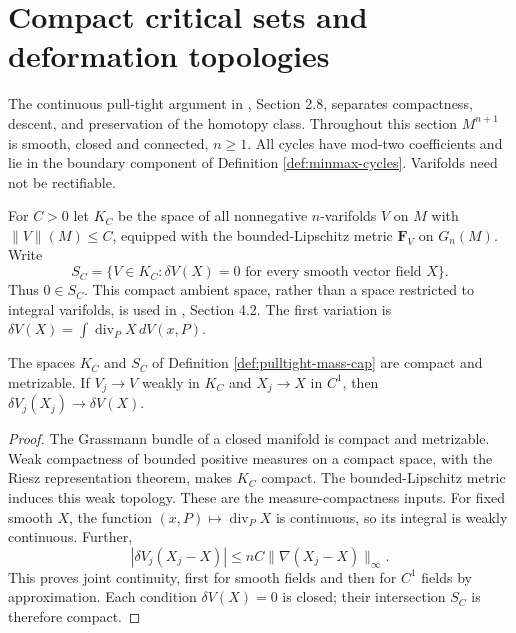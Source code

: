 \chapter{Compact critical sets and deformation topologies}\label{sec:critical-sets}
The continuous pull-tight argument in \cite{MNIndex}, Section 2.8, separates compactness, descent, and preservation of the homotopy class. Throughout this section $M^{n+1}$ is smooth, closed and connected, $n\geq1$. All cycles have mod-two coefficients and lie in the boundary component of Definition \ref{def:minmax-cycles}. Varifolds need not be rectifiable.

\begin{definition}\label{def:pulltight-mass-cap}
For $C>0$ let $K_C$ be the space of all nonnegative $n$-varifolds $V$ on $M$ with $\|V\|(M)\leq C$, equipped with the bounded-Lipschitz metric $\mathbf F_V$ on $G_n(M)$. Write
\[
 S_C=\{V\in K_C:\delta V(X)=0\text{ for every smooth vector field }X\}.
\]
Thus $0\in S_C$. This compact ambient space, rather than a space restricted to integral varifolds, is used in \cite{LiAP}, Section 4.2. The first variation is $\delta V(X)=\int\operatorname{div}_P X\,dV(x,P)$.
\end{definition}

\begin{lemma}\label{lem:pulltight-compact-cap}
The spaces $K_C$ and $S_C$ of Definition \ref{def:pulltight-mass-cap} are compact and metrizable. If $V_j\to V$ weakly in $K_C$ and $X_j\to X$ in $C^1$, then $\delta V_j(X_j)\to\delta V(X)$.
\end{lemma}
\begin{proof}
The Grassmann bundle of a closed manifold is compact and metrizable. Weak compactness of bounded positive measures on a compact space, with the Riesz representation theorem, makes $K_C$ compact. The bounded-Lipschitz metric induces this weak topology. These are the measure-compactness inputs. For fixed smooth $X$, the function $(x,P)\mapsto\operatorname{div}_P X$ is continuous, so its integral is weakly continuous. Further,
\[
 |\delta V_j(X_j-X)|\leq nC\|\nabla(X_j-X)\|_\infty.
\]
This proves joint continuity, first for smooth fields and then for $C^1$ fields by approximation. Each condition $\delta V(X)=0$ is closed; their intersection $S_C$ is therefore compact.
\end{proof}

